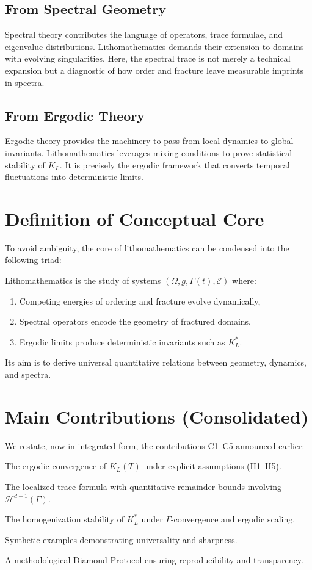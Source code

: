 \subsection*{From Spectral Geometry}
Spectral theory contributes the language of operators, trace formulae, and eigenvalue distributions. Lithomathematics demands their extension to domains with evolving singularities. Here, the spectral trace is not merely a technical expansion but a diagnostic of how order and fracture leave measurable imprints in spectra.

\subsection*{From Ergodic Theory}
Ergodic theory provides the machinery to pass from local dynamics to global invariants. Lithomathematics leverages mixing conditions to prove statistical stability of $K_L$. It is precisely the ergodic framework that converts temporal fluctuations into deterministic limits.

\section*{Definition of Conceptual Core}
To avoid ambiguity, the core of lithomathematics can be condensed into the following triad:

\begin{definition}
Lithomathematics is the study of systems $(\Omega, g, \Gamma(t), \mathcal{E})$ where:
\begin{enumerate}[label=(\roman*)]
\item Competing energies of ordering and fracture evolve dynamically,
\item Spectral operators encode the geometry of fractured domains,
\item Ergodic limits produce deterministic invariants such as $K_L^*$.
\end{enumerate}
Its aim is to derive universal quantitative relations between geometry, dynamics, and spectra.
\end{definition}

\section*{Main Contributions (Consolidated)}
We restate, now in integrated form, the contributions C1–C5 announced earlier:

\begin{description}[leftmargin=3em]
\item[C1:] The ergodic convergence of $K_L(T)$ under explicit assumptions (H1–H5).
\item[C2:] The localized trace formula with quantitative remainder bounds involving $\mathcal{H}^{d-1}(\Gamma)$.
\item[C3:] The homogenization stability of $K_L^*$ under $\Gamma$-convergence and ergodic scaling.
\item[C4:] Synthetic examples demonstrating universality and sharpness.
\item[C5:] A methodological Diamond Protocol ensuring reproducibility and transparency.
\end{description}


